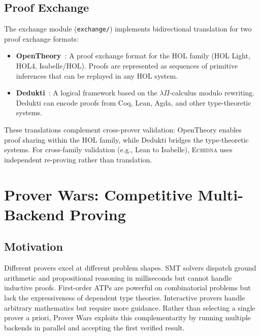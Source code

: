 \documentclass[11pt,a4paper]{article}
\newcommand{\echidna}{\textsc{Echidna}}
\begin{document}
\subsection{Proof Exchange}

The exchange module (\texttt{exchange/}) implements bidirectional translation
for two proof exchange formats:

\begin{itemize}
  \item \textbf{OpenTheory}~\citep{opentheory}: A proof exchange format for
  the HOL family (HOL Light, HOL4, Isabelle/HOL). Proofs are represented as
  sequences of primitive inferences that can be replayed in any HOL system.

  \item \textbf{Dedukti}~\citep{dedukti}: A logical framework based on the
  $\lambda\Pi$-calculus modulo rewriting. Dedukti can encode proofs from Coq,
  Lean, Agda, and other type-theoretic systems.
\end{itemize}

These translations complement cross-prover validation: OpenTheory enables
proof sharing within the HOL family, while Dedukti bridges the type-theoretic
systems. For cross-family validation (e.g., Lean to Isabelle), \echidna{}
uses independent re-proving rather than translation.


\section{Prover Wars: Competitive Multi-Backend Proving}
\label{sec:prover-wars}

\subsection{Motivation}

Different provers excel at different problem shapes. SMT solvers dispatch
ground arithmetic and propositional reasoning in milliseconds but cannot
handle inductive proofs. First-order ATPs are powerful on combinatorial
problems but lack the expressiveness of dependent type theories. Interactive
provers handle arbitrary mathematics but require more guidance. Rather than
selecting a single prover a priori, Prover Wars exploits this
complementarity by running multiple backends in parallel and accepting the
first verified result.
\end{document}
